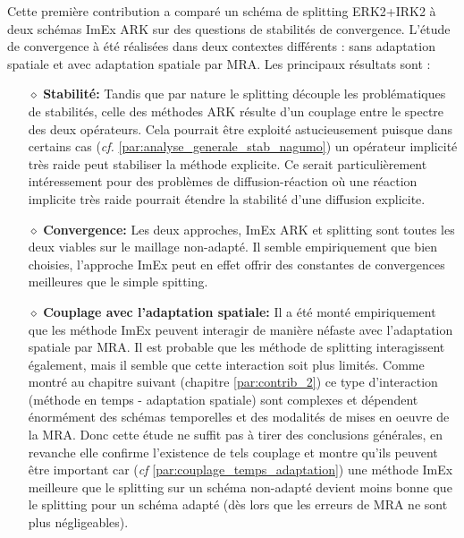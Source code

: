 Cette première contribution a comparé un schéma de splitting ERK2+IRK2 à deux schémas ImEx ARK sur des questions de stabilités de convergence. 
L'étude de convergence à été réalisées dans deux contextes différents : sans adaptation spatiale et avec adaptation spatiale par MRA.
Les principaux résultats sont : 
\begin{itemize}
    \item[$\diamond$] \textbf{Stabilité:} Tandis que par nature le splitting 
    découple les problématiques de stabilités, celle des méthodes ARK résulte d'un couplage entre le spectre des deux opérateurs.  
    Cela pourrait être exploité astucieusement puisque dans certains cas (\textit{cf.} \ref{par:analyse_generale_stab_nagumo})
    un opérateur implicité très raide peut stabiliser la méthode explicite. Ce serait particulièrement intéressement pour des problèmes de diffusion-réaction
    où une réaction implicite très raide pourrait étendre la stabilité d'une diffusion explicite.
    \item[$\diamond$] \textbf{Convergence:} Les deux approches, ImEx ARK et splitting sont toutes les deux viables sur le maillage non-adapté.
    Il semble empiriquement que bien choisies, l'approche ImEx peut en effet offrir des constantes de convergences meilleures que le simple spitting.
    \item[$\diamond$] \textbf{Couplage avec l'adaptation spatiale:} Il a été monté empiriquement
    que les méthode ImEx peuvent interagir de manière néfaste avec l'adaptation spatiale par MRA.
    Il est probable que les méthode de splitting interagissent également, mais il semble que cette interaction soit plus limités.
    Comme montré au chapitre suivant (chapitre \ref{par:contrib_2}) ce type d’interaction (méthode en temps - adaptation spatiale)
    sont complexes et dépendent énormément des schémas temporelles et des modalités de mises en oeuvre de la MRA. 
    Donc cette étude ne suffit pas à tirer des conclusions générales,
    en revanche elle confirme l'existence de tels couplage et montre qu'ils peuvent être important car  (\textit{cf} \ref{par:couplage_temps_adaptation}) une méthode ImEx meilleure que le splitting sur un schéma non-adapté 
    devient moins bonne que le splitting pour un schéma adapté (dès lors que les erreurs de MRA ne sont plus négligeables).
\end{itemize}
